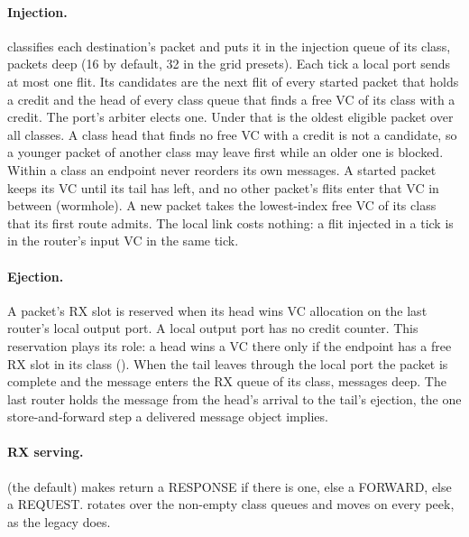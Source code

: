 \paragraph{Injection.}  classifies each destination's packet and puts it in the
injection queue of its class,  packets deep (16 by default, 32 in the
grid presets). Each tick a local port sends at most one flit. Its candidates are the next flit of
every started packet that holds a credit and the head of every class queue that finds a free VC
of its class with a credit. The port's arbiter elects one. Under  that is the
oldest eligible packet over all classes. A class head that finds no free VC with a credit is not a
candidate, so a younger packet of another class may leave first while an older one is blocked.
Within a class an endpoint never reorders its own messages. A started packet
keeps its VC until its tail has left, and no other packet's flits enter that VC in between
(wormhole). A new packet takes the lowest-index free VC of its class that its first route admits.
The local link costs nothing: a flit injected in a tick is in the router's input VC in the same
tick.

\paragraph{Ejection.} A packet's RX slot is reserved when its head wins VC allocation on the last
router's local output port. A local output port has no credit counter. This reservation plays
its role: a head wins a VC there only if the endpoint has a free RX slot in its class
(). When the tail leaves through the local port the packet is
complete and the message enters the RX queue of its class,  messages
deep. The last router holds the message from the head's arrival to the tail's ejection, the one
store-and-forward step a delivered message object implies.

\paragraph{RX serving.}   (the default) makes 
return a RESPONSE if there is one, else a FORWARD, else a REQUEST.  rotates over the
non-empty class queues and moves on every peek, as the legacy  does.

